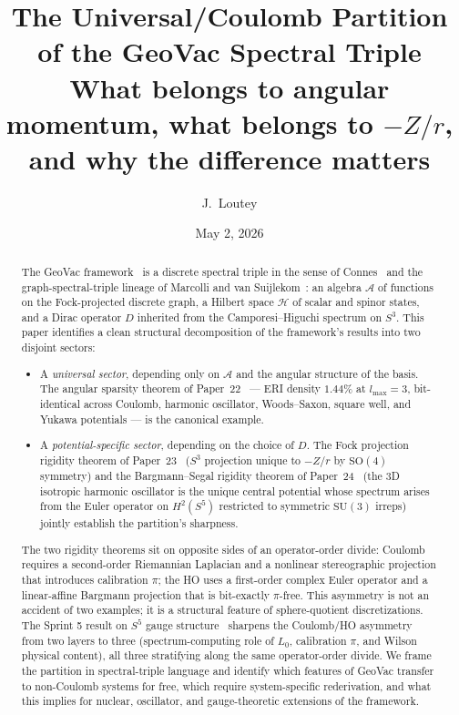 \documentclass[twocolumn,pra,amsmath,amssymb,superscriptaddress]{revtex4-2}
\begin{document}
\title{The Universal/Coulomb Partition of the GeoVac Spectral Triple\\
{\large What belongs to angular momentum, what belongs to $-Z/r$,\\
and why the difference matters}}

\author{J.~Loutey}

\date{May 2, 2026}

\begin{abstract}
The GeoVac framework~\cite{paper7,paper14} is a discrete spectral
triple in the sense of Connes~\cite{connes_book1994} and the
graph-spectral-triple lineage of Marcolli and van
Suijlekom~\cite{marcolli_vs2014}: an algebra $\mathcal{A}$ of
functions on the Fock-projected discrete graph, a Hilbert space
$\mathcal{H}$ of scalar and spinor states, and a Dirac operator $D$
inherited from the Camporesi--Higuchi spectrum on $S^3$.  This paper
identifies a clean structural decomposition of the framework's
results into two disjoint sectors:
\begin{itemize}
\item A \emph{universal sector}, depending only on $\mathcal{A}$ and
  the angular structure of the basis.  The angular sparsity theorem
  of Paper~22~\cite{paper22} --- ERI density $1.44\%$ at $l_{\max}=3$,
  bit-identical across Coulomb, harmonic oscillator, Woods--Saxon,
  square well, and Yukawa potentials --- is the canonical example.
\item A \emph{potential-specific sector}, depending on the choice
  of $D$.  The Fock projection rigidity theorem of
  Paper~23~\cite{paper23} ($S^3$ projection unique to $-Z/r$ by
  $\mathrm{SO}(4)$ symmetry) and the Bargmann--Segal rigidity
  theorem of Paper~24~\cite{paper24} (the 3D isotropic harmonic
  oscillator is the unique central potential whose spectrum arises
  from the Euler operator on $H^2(S^5)$ restricted to symmetric
  $\mathrm{SU}(3)$ irreps) jointly establish the partition's
  sharpness.
\end{itemize}
The two rigidity theorems sit on opposite sides of an operator-order
divide: Coulomb requires a second-order Riemannian Laplacian and a
nonlinear stereographic projection that introduces calibration $\pi$;
the HO uses a first-order complex Euler operator and a linear-affine
Bargmann projection that is bit-exactly $\pi$-free.  This asymmetry is
not an accident of two examples; it is a structural feature of
sphere-quotient discretizations.  The Sprint 5 result on $S^5$ gauge
structure~\cite{paper25} sharpens the Coulomb/HO asymmetry from two
layers to three (spectrum-computing role of $L_0$, calibration $\pi$,
and Wilson physical content), all three stratifying along the same
operator-order divide.  We frame the partition in spectral-triple
language and identify which features of GeoVac transfer to non-Coulomb
systems for free, which require system-specific rederivation, and what
this implies for nuclear, oscillator, and gauge-theoretic
extensions of the framework.
\end{abstract}
\end{document}
